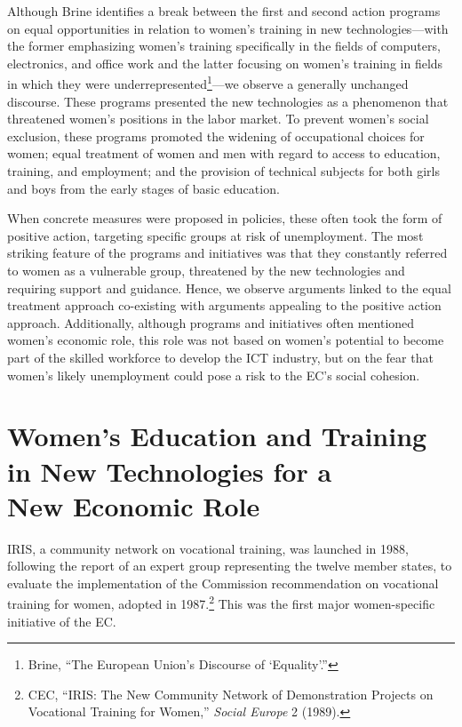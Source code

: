 \documentclass{tufte-handout}
\begin{document}
Although Brine identifies a break between the first and second action
programs on equal opportunities in relation to women's training in new
technologies---with the former emphasizing women's training specifically
in the fields of computers, electronics, and office work and the latter
focusing on women's training in fields in which they were
underrepresented\footnote{Brine, ``The European Union's Discourse of
  `Equality'.''}---we observe a generally unchanged discourse. These
programs presented the new technologies as a phenomenon that threatened
women's positions in the labor market. To prevent women's social
exclusion, these programs promoted the widening of occupational choices
for women; equal treatment of women and men with regard to access to
education, training, and employment; and the provision of technical
subjects for both girls and boys from the early stages of basic
education.

When concrete measures were proposed in policies, these often took the
form of positive action, targeting specific groups at risk of
unemployment. The most striking feature of the programs and initiatives
was that they constantly referred to women as a vulnerable group,
threatened by the new technologies and requiring support and guidance.
Hence, we observe arguments linked to the equal treatment approach
co-existing with arguments appealing to the positive action approach.
Additionally, although programs and initiatives often mentioned women's
economic role, this role was not based on women's potential to become
part of the skilled workforce to develop the ICT industry, but on the
fear that women's likely unemployment could pose a risk to the EC's
social cohesion.

\hypertarget{womens-education-and-training-in-new-technologies-for-a-new-economic-role}{%
\section{Women's Education and Training in New Technologies for a\\\noindent New
Economic
Role}\label{womens-education-and-training-in-new-technologies-for-a-new-economic-role}}

IRIS, a community network on vocational training, was launched in 1988,
following the report of an expert group representing the twelve member
states, to evaluate the implementation of the Commission recommendation
on vocational training for women, adopted in 1987.\footnote{CEC, ``IRIS:
  The New Community Network of Demonstration Projects on Vocational
  Training for Women,'' \emph{Social Europe} 2 (1989).} This was the
first major women-specific initiative of the EC.
\end{document}
